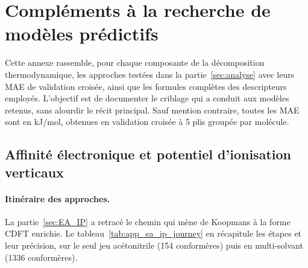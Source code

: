 \clearpage
\appendix

\section{Compléments à la recherche de modèles prédictifs}
\label{app:models}

Cette annexe rassemble, pour chaque composante de la décomposition thermodynamique, les approches testées dans la partie~\ref{sec:analyse} avec leurs MAE de validation croisée, ainsi que les formules complètes des descripteurs employés. L'objectif est de documenter le criblage qui a conduit aux modèles retenus, sans alourdir le récit principal. Sauf mention contraire, toutes les MAE sont en kJ/mol, obtenues en validation croisée à 5 plis groupée par molécule.

\subsection{Affinité électronique et potentiel d'ionisation verticaux}
\label{app:ea_ip_search}

\paragraph{Itinéraire des approches.}
La partie~\ref{sec:EA_IP} a retracé le chemin qui mène de Koopmans à la forme CDFT enrichie. Le tableau~\ref{tab:app_ea_ip_journey} en récapitule les étapes et leur précision, sur le seul jeu acétonitrile (154 conformères) puis en multi-solvant (1336 conformères).

